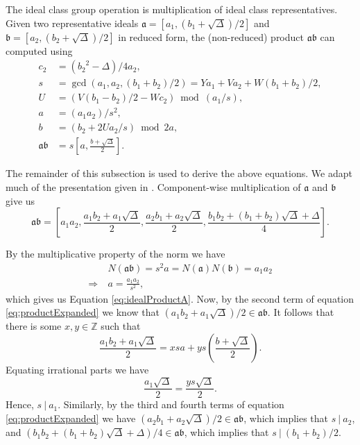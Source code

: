\documentclass{ucalgthes1}
\theoremstyle{definition}
\newcommand{\ZZ}{\mathbb{Z}}
\begin{document}
The ideal class group operation is multiplication of ideal class representatives. Given two representative ideals $\mathfrak a = [a_1, (b_1 + \sqrt{\Delta})/2]$ and $\mathfrak b = [a_2, (b_2 + \sqrt{\Delta})/2]$ in reduced form, the (non-reduced) product $\mathfrak a \mathfrak b$ can computed using
\begin{align}
	c_2 & = ({b_2}^2-\Delta)/4a_2, \\
	s & = \gcd(a_1, a_2, (b_1+b_2)/2) = Ya_1 + Va_2 + W(b_1+b_2)/2,    \label{eq:idealProductS} \\
	U & = (V(b_1-b_2)/2 - Wc_2) \bmod{(a_1/s)},                        \label{eq:idealProductU} \\
	a & = (a_1a_2)/s^2,                                                \label{eq:idealProductA} \\
	b & = (b_2 + 2Ua_2/s) \bmod{2a},                                   \label{eq:idealProductB} \\
	\mathfrak a \mathfrak b & = s\left[a, \frac{b + \sqrt{\Delta}}{2}\right].
\end{align}

The remainder of this subsection is used to derive the above equations.  We adapt much of the presentation given in \cite[pp.117,118]{Jacobson2009}. Component-wise multiplication of $\mathfrak a$ and $\mathfrak b$ give us
\begin{equation}
\label{eq:productExpanded}
\mathfrak{a} \mathfrak{b} =
\left[ a_1a_2, \frac{a_1b_2 + a_1\sqrt{\Delta}}{2}, \frac{a_2b_1 + a_2\sqrt{\Delta}}{2}, \frac{b_1b_2 + (b_1+b_2)\sqrt{\Delta} + \Delta}{4} \right].
\end{equation}

\noindent
By the multiplicative property of the norm we have
\begin{align*}
	& N(\mathfrak{a}\mathfrak{b}) = s^2a = N(\mathfrak{a})N(\mathfrak{b}) = a_1 a_2 \\
	\Rightarrow~ & a = \frac{a_1a_2}{s^2},
\end{align*}
which gives us Equation \ref{eq:idealProductA}. Now, by the second term of equation \eqref{eq:productExpanded} we know that $(a_1b_2 + a_1\sqrt{\Delta})/2 \in \mathfrak{a}\mathfrak{b}$.  It follows that there is some $x,y \in \ZZ$ such that
\[
	\frac{a_1b_2 + a_1\sqrt{\Delta}}{2} = xsa + ys\left(\frac{b+\sqrt{\Delta}}{2}\right).
\]
Equating irrational parts we have
\begin{equation*}
	\frac{a_1\sqrt{\Delta}}{2} = \frac{ys\sqrt{\Delta}}{2}.
\end{equation*}
\noindent
Hence, $s ~|~ a_1$.  Similarly, by the third and fourth terms of equation \eqref{eq:productExpanded} we have $(a_2b_1+a_2\sqrt{\Delta})/2 \in \mathfrak{a}\mathfrak{b}$, which implies that $s~|~a_2$, and $(b_1b_2 + (b_1+b_2)\sqrt{\Delta} + \Delta)/4 \in \mathfrak{a}\mathfrak{b}$, which implies that $s~|~(b_1+b_2)/2$. 
\end{document}
